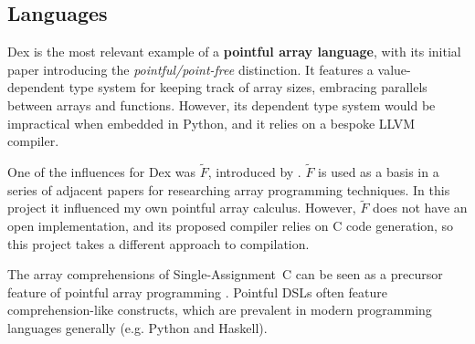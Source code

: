 \subsection{Languages}

Dex is the most relevant example of a \textbf{pointful array language}, with its initial paper \cite{paszke2021getting} introducing the \textit{pointful/point-free} distinction. 
It features a value-dependent type system for keeping track of array sizes, embracing parallels between arrays and functions. 
However, its dependent type system would be impractical when embedded in Python, and it relies on a bespoke LLVM compiler.

One of the influences for Dex was $\tilde F$, introduced by \textcite{shaikhha2019efficient}. 
$\tilde F$ is used as a basis in a series of adjacent papers for researching array programming techniques.
In this project it influenced my own pointful array calculus.
However, $\tilde F$ does not have an open implementation, and its proposed compiler relies on C code generation, so this project takes a different approach to compilation. 

The array comprehensions of Single-Assignment~C can be seen as a precursor feature of pointful array programming \cite{scholz1994single}. Pointful DSLs often feature comprehension-like constructs, which are prevalent in modern programming languages generally (e.g. Python and Haskell). 




